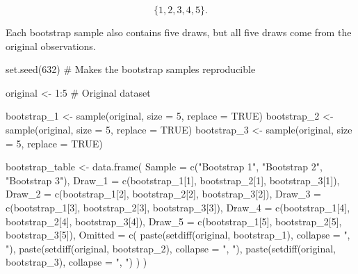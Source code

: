 \documentclass[
  letterpaper,
  DIV=11,
  numbers=noendperiod]{scrreprt}
\newenvironment{Shaded}{\begin{snugshade}}{\end{snugshade}}
\newcommand{\AttributeTok}[1]{\textcolor[rgb]{0.40,0.45,0.13}{#1}}
\newcommand{\CommentTok}[1]{\textcolor[rgb]{0.37,0.37,0.37}{#1}}
\newcommand{\ConstantTok}[1]{\textcolor[rgb]{0.56,0.35,0.01}{#1}}
\newcommand{\DecValTok}[1]{\textcolor[rgb]{0.68,0.00,0.00}{#1}}
\newcommand{\FunctionTok}[1]{\textcolor[rgb]{0.28,0.35,0.67}{#1}}
\newcommand{\NormalTok}[1]{\textcolor[rgb]{0.00,0.23,0.31}{#1}}
\newcommand{\OtherTok}[1]{\textcolor[rgb]{0.00,0.23,0.31}{#1}}
\newcommand{\SpecialCharTok}[1]{\textcolor[rgb]{0.37,0.37,0.37}{#1}}
\newcommand{\StringTok}[1]{\textcolor[rgb]{0.13,0.47,0.30}{#1}}
\begin{document}
\[
\{1,2,3,4,5\}.
\]

Each bootstrap sample also contains five draws, but all five draws come
from the original observations.

\begin{Shaded}
\begin{Highlighting}[]
\FunctionTok{set.seed}\NormalTok{(}\DecValTok{632}\NormalTok{) }\CommentTok{\# Makes the bootstrap samples reproducible}

\NormalTok{original }\OtherTok{\textless{}{-}} \DecValTok{1}\SpecialCharTok{:}\DecValTok{5} \CommentTok{\# Original dataset}

\NormalTok{bootstrap\_1 }\OtherTok{\textless{}{-}} \FunctionTok{sample}\NormalTok{(original, }\AttributeTok{size =} \DecValTok{5}\NormalTok{, }\AttributeTok{replace =} \ConstantTok{TRUE}\NormalTok{)}
\NormalTok{bootstrap\_2 }\OtherTok{\textless{}{-}} \FunctionTok{sample}\NormalTok{(original, }\AttributeTok{size =} \DecValTok{5}\NormalTok{, }\AttributeTok{replace =} \ConstantTok{TRUE}\NormalTok{)}
\NormalTok{bootstrap\_3 }\OtherTok{\textless{}{-}} \FunctionTok{sample}\NormalTok{(original, }\AttributeTok{size =} \DecValTok{5}\NormalTok{, }\AttributeTok{replace =} \ConstantTok{TRUE}\NormalTok{)}

\NormalTok{bootstrap\_table }\OtherTok{\textless{}{-}} \FunctionTok{data.frame}\NormalTok{(}
  \AttributeTok{Sample =} \FunctionTok{c}\NormalTok{(}\StringTok{"Bootstrap 1"}\NormalTok{, }\StringTok{"Bootstrap 2"}\NormalTok{, }\StringTok{"Bootstrap 3"}\NormalTok{),}
  \AttributeTok{Draw\_1 =} \FunctionTok{c}\NormalTok{(bootstrap\_1[}\DecValTok{1}\NormalTok{], bootstrap\_2[}\DecValTok{1}\NormalTok{], bootstrap\_3[}\DecValTok{1}\NormalTok{]),}
  \AttributeTok{Draw\_2 =} \FunctionTok{c}\NormalTok{(bootstrap\_1[}\DecValTok{2}\NormalTok{], bootstrap\_2[}\DecValTok{2}\NormalTok{], bootstrap\_3[}\DecValTok{2}\NormalTok{]),}
  \AttributeTok{Draw\_3 =} \FunctionTok{c}\NormalTok{(bootstrap\_1[}\DecValTok{3}\NormalTok{], bootstrap\_2[}\DecValTok{3}\NormalTok{], bootstrap\_3[}\DecValTok{3}\NormalTok{]),}
  \AttributeTok{Draw\_4 =} \FunctionTok{c}\NormalTok{(bootstrap\_1[}\DecValTok{4}\NormalTok{], bootstrap\_2[}\DecValTok{4}\NormalTok{], bootstrap\_3[}\DecValTok{4}\NormalTok{]),}
  \AttributeTok{Draw\_5 =} \FunctionTok{c}\NormalTok{(bootstrap\_1[}\DecValTok{5}\NormalTok{], bootstrap\_2[}\DecValTok{5}\NormalTok{], bootstrap\_3[}\DecValTok{5}\NormalTok{]),}
  \AttributeTok{Omitted =} \FunctionTok{c}\NormalTok{(}
    \FunctionTok{paste}\NormalTok{(}\FunctionTok{setdiff}\NormalTok{(original, bootstrap\_1), }\AttributeTok{collapse =} \StringTok{", "}\NormalTok{),}
    \FunctionTok{paste}\NormalTok{(}\FunctionTok{setdiff}\NormalTok{(original, bootstrap\_2), }\AttributeTok{collapse =} \StringTok{", "}\NormalTok{),}
    \FunctionTok{paste}\NormalTok{(}\FunctionTok{setdiff}\NormalTok{(original, bootstrap\_3), }\AttributeTok{collapse =} \StringTok{", "}\NormalTok{)}
\NormalTok{  )}
\NormalTok{)}


\end{Highlighting}
\end{Shaded}
\end{document}
